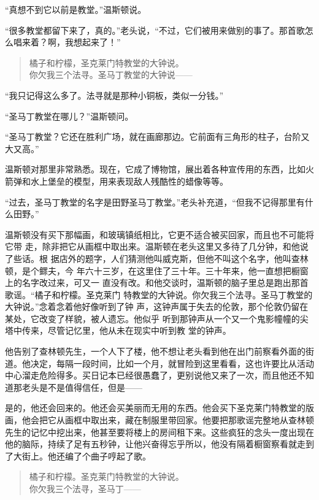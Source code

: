 ``真想不到它以前是教堂。''温斯顿说。

``很多教堂都留下来了，真的。''老头说，``不过，它们被用来做别的事了。那首歌怎么唱来着？啊，我想起来了！''

\begin{quotation}
\noindent 橘子和柠檬，圣克莱门特教堂的大钟说。\\
你欠我三个法寻。圣马丁教堂的大钟说——
\end{quotation}

``我只记得这么多了。法寻就是那种小铜板，类似一分钱。''

``圣马丁教堂在哪儿？''温斯顿问。

``圣马丁教堂？它还在胜利广场，就在画廊那边。它前面有三角形的柱子，台阶又大又高。''

温斯顿对那里非常熟悉。现在，它成了博物馆，展出着各种宣传用的东西，比如火箭弹和水上堡垒的模型，用来表现敌人残酷性的蜡像等等。

``过去，圣马丁教堂的名字是田野圣马丁教堂。''老头补充道，``但我不记得那里有什么田野。''

温斯顿没有买下那幅画，和玻璃镇纸相比，它更不适合被买回家，而且也不可能将它带
走，除非把它从画框中取出来。温斯顿在老头这里又多待了几分钟，和他说了些话。根
据店外的题字，人们猜测他叫威克斯，但他不叫这个名字，他叫查林顿，是个鳏夫，今
年六十三岁，在这里住了三十年。三十年来，他一直想把橱窗上的名字改过来，可又一
直没有改。和他交谈时，温斯顿的脑子里总是跑出那首歌谣。``橘子和柠檬。圣克莱门
特教堂的大钟说。你欠我三个法寻。圣马丁教堂的大钟说。''念着念着他好像听到了钟
声，这钟声属于失去的伦敦，那个伦敦仍留在某处，它改变了样貌，被人遗忘。他似乎
听到那钟声从一个又一个鬼影幢幢的尖塔中传来，尽管记忆里，他从未在现实中听到教
堂的钟声。

他告别了查林顿先生，一个人下了楼，他不想让老头看到他在出门前察看外面的街道。他决定，每隔一段时间，比如一个月，就冒险到这里看看，这也许要比从活动中心溜走危险得多。买日记本已经很愚蠢了，更别说他又来了一次，而且他还不知道那老头是不是值得信任，但是——

是的，他还会回来的。他还会买美丽而无用的东西。他会买下圣克莱门特教堂的版画，他会把它从画框中取出来，藏在制服里带回家。他要把那歌谣完整地从查林顿先生的记忆中挖出来，他甚至要将楼上的房间租下来。这些疯狂的念头一度出现在他的脑际，持续了足有五秒钟，让他兴奋得忘乎所以，他没有隔着橱窗察看就走到了大街上。他还编了个曲子哼起了歌。

\begin{quotation}
橘子和柠檬。圣克莱门特教堂的大钟说。\\
你欠我三个法寻，圣马丁——
\end{quotation}


